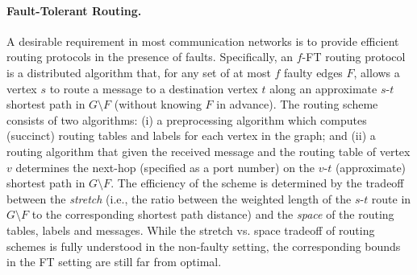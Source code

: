 \paragraph{Fault-Tolerant Routing.} A desirable requirement in most communication networks is to provide efficient routing protocols in the presence of faults. Specifically, an $f$-FT routing protocol is a distributed algorithm that, for any set of at most $f$ faulty edges $F$, allows a vertex $s$ to route a message to a destination vertex $t$ along an approximate $s$-$t$ shortest path in $G \setminus F$ (without knowing $F$ in advance). The routing scheme consists of two algorithms: (i) a preprocessing algorithm which computes (succinct) routing tables and labels for each vertex in the graph; and (ii) a routing algorithm that given the received message and the routing table of vertex $v$ determines the next-hop (specified as a port number) on the $v$-$t$ (approximate) shortest path in $G \setminus F$. The efficiency of the scheme is determined by the tradeoff between the \emph{stretch} (i.e., the ratio between the weighted length of the $s$-$t$ route in $G\setminus F$ to the corresponding shortest path distance) and the \emph{space} of the routing tables, labels and messages. 
%
%
%
While the stretch vs. space tradeoff of routing schemes is fully understood in the non-faulty setting, the corresponding bounds in the FT setting are still far from optimal. %
